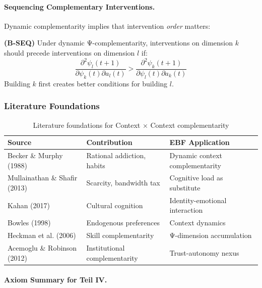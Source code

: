 \paragraph{Sequencing Complementary Interventions.}

Dynamic complementarity implies that intervention \emph{order} matters:

\begin{axiom}
\label{ax:B-SEQ}
\textbf{(B-SEQ)} Under dynamic Ψ-complementarity, interventions on dimension $k$ 
should precede interventions on dimension $l$ if:
\begin{equation}
\frac{\partial^2 \psi_l(t+1)}{\partial \psi_k(t) \partial a_l(t)} > 
\frac{\partial^2 \psi_k(t+1)}{\partial \psi_l(t) \partial a_k(t)}
\end{equation}
Building $k$ first creates better conditions for building $l$.
\end{axiom}

\subsubsection{Literature Foundations}

\begin{table}[h]
\centering
\small
\begin{tabular}{p{3.5cm}p{4cm}p{5cm}}
\toprule
\textbf{Source} & \textbf{Contribution} & \textbf{EBF Application} \\
\midrule
Becker \& Murphy (1988) & Rational addiction, habits & Dynamic context complementarity \\
Mullainathan \& Shafir (2013) & Scarcity, bandwidth tax & Cognitive load as substitute \\
Kahan (2017) & Cultural cognition & Identity-emotional interaction \\
Bowles (1998) & Endogenous preferences & Context dynamics \\
Heckman et al. (2006) & Skill complementarity & Ψ-dimension accumulation \\
Acemoglu \& Robinson (2012) & Institutional complementarity & Trust-autonomy nexus \\
\bottomrule
\end{tabular}
\caption{Literature foundations for Context × Context complementarity}
\label{tab:context-context-lit}
\end{table}

\paragraph{Axiom Summary for Teil IV.}


